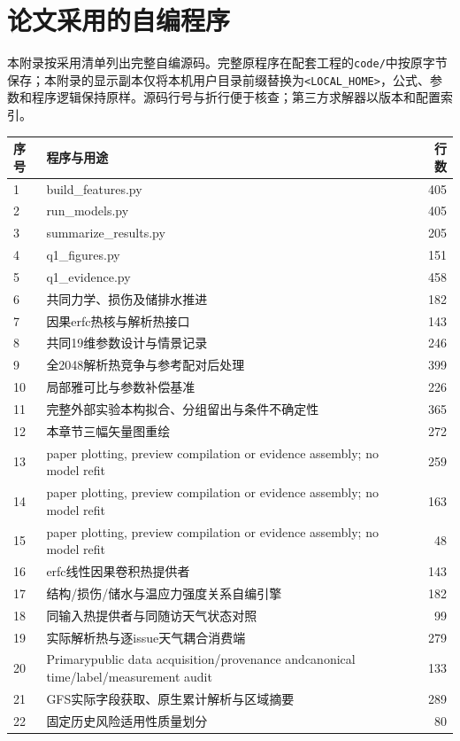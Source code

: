 \section{论文采用的自编程序}
本附录按采用清单列出完整自编源码。完整原程序在配套工程的\texttt{code/}中按原字节保存；本附录的显示副本仅将本机用户目录前缀替换为\texttt{<LOCAL\_HOME>}，公式、参数和程序逻辑保持原样。源码行号与折行便于核查；第三方求解器以版本和配置索引。
\begin{longtable}{p{}p{}r}
\toprule 序号 & 程序与用途 & 行数\\\midrule\endhead
1 & build\_features.py & 405\\
2 & run\_models.py & 405\\
3 & summarize\_results.py & 205\\
4 & q1\_figures.py & 151\\
5 & q1\_evidence.py & 458\\
6 & 共同力学、损伤及储排水推进 & 182\\
7 & 因果erfc热核与解析热接口 & 143\\
8 & 共同19维参数设计与情景记录 & 246\\
9 & 全2048解析热竞争与参考配对后处理 & 399\\
10 & 局部雅可比与参数补偿基准 & 226\\
11 & 完整外部实验本构拟合、分组留出与条件不确定性 & 365\\
12 & 本章节三幅矢量图重绘 & 272\\
13 & paper plotting, preview compilation or evidence assembly; no model refit & 259\\
14 & paper plotting, preview compilation or evidence assembly; no model refit & 163\\
15 & paper plotting, preview compilation or evidence assembly; no model refit & 48\\
16 & erfc线性因果卷积热提供者 & 143\\
17 & 结构/损伤/储水与温应力强度关系自编引擎 & 182\\
18 & 同输入热提供者与同随访天气状态对照 & 99\\
19 & 实际解析热与逐issue天气耦合消费端 & 279\\
20 & Primarypublic data acquisition/provenance andcanonical time/label/measurement audit & 133\\
21 & GFS实际字段获取、原生累计解析与区域摘要 & 289\\
22 & 固定历史风险适用性质量划分 & 80\\

\end{longtable}
